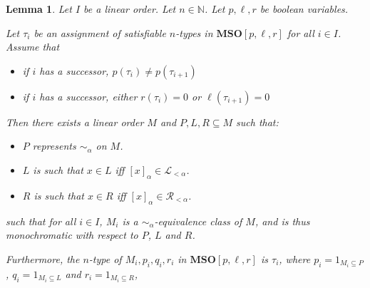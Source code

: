 \documentclass{article}
\newtheorem{lemma}{Lemma}
\newcommand{\brackets}[1]{\left[ {#1} \right]}
\newcommand{\mso}{\mathbf{MSO}}
\newcommand{\NN}{\mathbb{N}}
\begin{document}
\begin{lemma}
  Let $I$ be a linear order. Let $n \in \NN$. Let $p, \ell, r$ be boolean variables.

  Let $\tau_i$ be an assignment of satisfiable $n$-types in $\mso[p, \ell, r]$ for all $i \in I$. Assume that
  \begin{itemize}
    \item if $i$ has a successor, $p(\tau_i) \ne p(\tau_{i+1})$
    \item if $i$ has a successor, either $r(\tau_i) = 0$ or $\ell(\tau_{i+1}) = 0$
  \end{itemize}

  Then there exists a linear order $M$ and $P, L, R \subseteq M$ such that:
  \begin{itemize}
    \item $P$ represents $\sim_{\alpha}$ on $M$.
    \item $L$ is such that $x \in L$ iff $\brackets{x}_{\alpha} \in \mathcal{L}_{< \alpha}$.
    \item $R$ is such that $x \in R$ iff $\brackets{x}_{\alpha} \in \mathcal{R}_{< \alpha}$.
  \end{itemize}

  such that for all $i \in I$, $M_i$ is a $\sim_{\alpha}$-equivalence class of $M$,
  and is thus monochromatic with respect to $P$, $L$ and $R$.

  Furthermore, the $n$-type of $M_i, p_i, q_i, r_i$ in $\mso[p, \ell, r]$ is $\tau_i$, where
  $p_i = 1_{M_i \subseteq P}$, $q_i = 1_{M_i \subseteq L}$ and $r_i = 1_{M_i \subseteq R}$,
\end{lemma}
\end{document}
